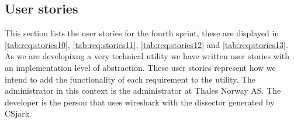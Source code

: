 \subsection{User stories}
\label{sec:req:stories4}
This section lists the user stories for the fourth sprint, these are displayed in \autoref{tab:req:stories10}, \autoref{tab:req:stories11}, \autoref{tab:req:stories12} and \autoref{tab:req:stories13}.
As we are developixng a very technical \gls{utility} we have written user stories with an implementation level of abstraction. 
These user stories represent how we intend to add the functionality of each requirement to the \gls{utility}.
The administrator in this context is the administrator at Thales Norway AS. 
The developer is the person that uses \Gls{wireshark} with the \gls{dissector} generated by CSjark.

